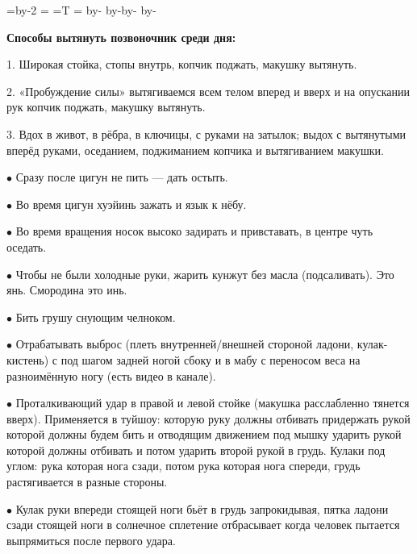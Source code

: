\pdfhorigin=15mm \hsize=\pdfpagewidth \advance\hsize by-2\pdfhorigin
\pdfvorigin=15mm \vsize=\pdfpageheight
{}=\hbox{T} =\topskip \advance{} by-
\advance\vsize by-\pdfvorigin \advance\pdfvorigin by- \advance\vsize by-\pdfvorigin

{\bf Способы вытянуть позвоночник среди дня:}

\item{1.} Широкая стойка, стопы внутрь, копчик поджать, макушку вытянуть.

\item{2.} «Пробуждение силы» вытягиваемся всем телом вперед и вверх и на опускании
рук копчик поджать, макушку вытянуть.

\item{3.} Вдох в живот, в рёбра, в ключицы, с руками на затылок;
выдох с вытянутыми вперёд руками, оседанием, поджиманием копчика и
вытягиванием макушки.

\bigskip

\item{$\bullet$} Сразу после цигун не пить --- дать остыть.

\item{$\bullet$} Во время цигун хуэйинь зажать и язык к нёбу.

\item{$\bullet$} Во время вращения носок высоко задирать и привставать, в центре чуть оседать.

\item{$\bullet$} Чтобы не были холодные руки, жарить кунжут без масла (подсаливать).
Это янь. Смородина это инь.

\item{$\bullet$} Бить грушу снующим челноком.

\item{$\bullet$} Отрабатывать выброс (плеть внутренней/внешней стороной ладони, кулак-кистень) с под шагом задней ногой сбоку и в мабу с переносом веса на разноимённую ногу (есть видео в канале).

\item{$\bullet$} Проталкивающий удар в правой и левой стойке (макушка расслабленно тянется вверх).
Применяется в туйшоу: которую руку должны отбивать придержать рукой которой должны будем бить и отводящим движением под мышку ударить рукой которой должны отбивать и потом ударить второй рукой в грудь. Кулаки под углом: рука которая нога сзади, потом рука которая нога спереди, грудь растягивается в разные стороны.

\item{$\bullet$} Кулак руки впереди стоящей ноги бьёт в грудь запрокидывая, пятка ладони сзади стоящей ноги в солнечное сплетение отбрасывает когда человек пытается выпрямиться после первого удара.

